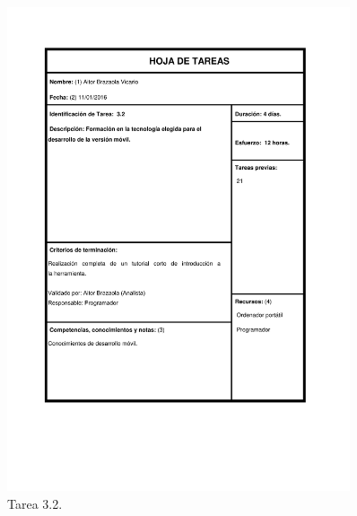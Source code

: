 \documentclass{DeustoFDP}
\begin{document}
\begin{figure}[H]
    \centering
    \includegraphics[width=0.9\textwidth]{fig/Tareas/32}
    \caption{Tarea 3.2.}
    \label{fig:t32}
\end{figure}
\end{document}
